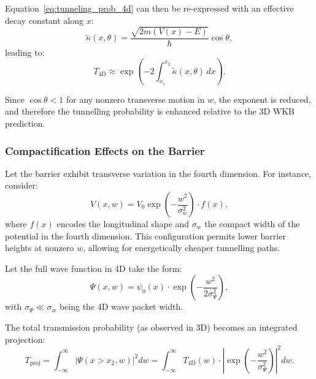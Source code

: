 \documentclass[12pt]{article}
\begin{document}
Equation~\eqref{eq:tunneling_prob_4d} can then be re-expressed with an effective decay constant along \( x \):
\begin{equation}
\tilde{\kappa}(x, \theta) = \frac{\sqrt{2m(V(x) - E)}}{\hbar} \cos\theta,
\label{eq:effective_kappa_theta}
\end{equation}
leading to:
\begin{equation}
T_{\text{4D}} \approx \exp\left(-2 \int_{x_1}^{x_2} \tilde{\kappa}(x, \theta) \, dx \right).
\label{eq:tunneling_prob_projected}
\end{equation}

Since \( \cos\theta < 1 \) for any nonzero transverse motion in \( w \), the exponent is reduced, and therefore the tunnelling probability is enhanced relative to the 3D WKB prediction.

\subsubsection*{Compactification Effects on the Barrier}

Let the barrier exhibit transverse variation in the fourth dimension. For instance, consider:
\begin{equation}
V(x, w) = V_0 \exp\left(-\frac{w^2}{\sigma_w^2}\right) \cdot f(x),
\label{eq:gaussian_barrier}
\end{equation}
where \( f(x) \) encodes the longitudinal shape and \( \sigma_w \) the compact width of the potential in the fourth dimension. This configuration permits lower barrier heights at nonzero \( w \), allowing for energetically cheaper tunnelling paths.

Let the full wave function in 4D take the form:
\begin{equation}
\Psi(x, w) = \psi_0(x) \cdot \exp\left(-\frac{w^2}{2\sigma_\Psi^2}\right),
\label{eq:wavefunction_4d}
\end{equation}
with \( \sigma_\Psi \ll \sigma_w \) being the 4D wave packet width.

The total transmission probability (as observed in 3D) becomes an integrated projection:
\begin{equation}
T_{\text{proj}} = \int_{-\infty}^{\infty} |\Psi(x > x_2, w)|^2 dw = \int_{-\infty}^{\infty} T_{\text{4D}}(w) \cdot \left|\exp\left(-\frac{w^2}{\sigma_\Psi^2}\right)\right|^2 dw.
\label{eq:projected_transmission}
\end{equation}
\end{document}
